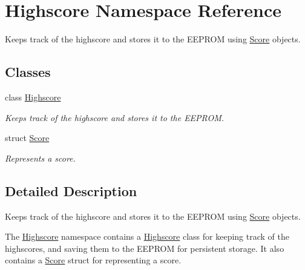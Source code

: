 \hypertarget{namespace_highscore}{}\section{Highscore Namespace Reference}
\label{namespace_highscore}


Keeps track of the highscore and stores it to the E\+E\+P\+R\+OM using \hyperlink{struct_highscore_1_1_score}{Score} objects.  


\subsection*{Classes}
\begin{DoxyCompactItemize}
\item 
class \hyperlink{class_highscore_1_1_highscore}{Highscore}
\begin{DoxyCompactList}\small\item\em Keeps track of the highscore and stores it to the E\+E\+P\+R\+OM. \end{DoxyCompactList}\item 
struct \hyperlink{struct_highscore_1_1_score}{Score}
\begin{DoxyCompactList}\small\item\em Represents a score. \end{DoxyCompactList}\end{DoxyCompactItemize}


\subsection{Detailed Description}
Keeps track of the highscore and stores it to the E\+E\+P\+R\+OM using \hyperlink{struct_highscore_1_1_score}{Score} objects. 

The \hyperlink{namespace_highscore}{Highscore} namespace contains a \hyperlink{namespace_highscore}{Highscore} class for keeping track of the highscores, and saving them to the E\+E\+P\+R\+OM for persistent storage. It also contains a \hyperlink{struct_highscore_1_1_score}{Score} struct for representing a score. 